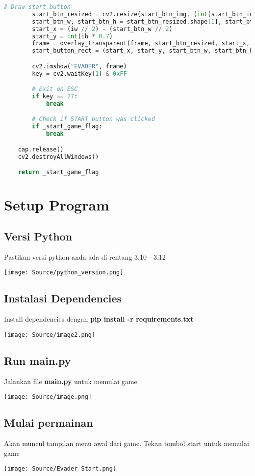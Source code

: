 \documentclass[11pt,a4paper]{article}
\begin{document}
\begin{lstlisting}[language=Python, caption=menu\textunderscore manager]
        # Draw start button
        start_btn_resized = cv2.resize(start_btn_img, (int(start_btn_img.shape[1] * 0.3), int(start_btn_img.shape[0] * 0.3)), interpolation=cv2.INTER_AREA)
        start_btn_w, start_btn_h = start_btn_resized.shape[1], start_btn_resized.shape[0]
        start_x = (iw // 2) - (start_btn_w // 2)
        start_y = int(ih * 0.7)
        frame = overlay_transparent(frame, start_btn_resized, start_x, start_y, (start_btn_w, start_btn_h))
        start_button_rect = (start_x, start_y, start_btn_w, start_btn_h)

        cv2.imshow("EVADER", frame)
        key = cv2.waitKey(1) & 0xFF

        # Exit on ESC
        if key == 27:
            break

        # Check if START button was clicked
        if _start_game_flag:
            break

    cap.release()
    cv2.destroyAllWindows()

    return _start_game_flag
\end{lstlisting}
\section{Setup Program}
\subsection{Versi Python}
Pastikan versi python anda ada di rentang 3.10 - 3.12
\begin{center}
	\texttt{[image: Source/python\_version.png]}
\end{center}
\subsection{Instalasi Dependencies}
Install dependencies dengan \textbf{pip install -r requirements.txt}
\begin{center}
	\texttt{[image: Source/image2.png]}
\end{center}
\subsection{Run main.py}
Jalankan file \textbf{main.py} untuk memulai game
\begin{center}
	\texttt{[image: Source/image.png]}
\end{center}

\subsection{Mulai permainan}
Akan muncul tampilan menu awal dari game. Tekan tombol start untuk memulai game
\begin{center}
	\texttt{[image: Source/Evader Start.png]}
\end{center}
\end{document}
